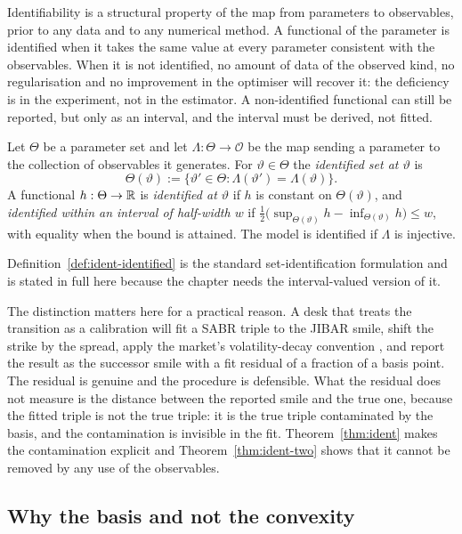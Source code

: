 \documentclass[../../../main.tex]{subfiles}
\begin{document}
Identifiability is a structural property of the map from parameters to observables, prior to any data and to any numerical method. A functional of the parameter is identified when it takes the same value at every parameter consistent with the observables. When it is not identified, no amount of data of the observed kind, no regularisation and no improvement in the optimiser will recover it: the deficiency is in the experiment, not in the estimator. A non-identified functional can still be reported, but only as an interval, and the interval must be derived, not fitted.

\begin{definition}\label{def:ident-identified}
Let $\Theta$ be a parameter set and let $\Lambda:\Theta\to\mathcal O$ be the map sending a parameter to the collection of observables it generates. For $\vartheta\in\Theta$ the \emph{identified set at $\vartheta$} is
\[
\Theta(\vartheta):=\{\vartheta'\in\Theta:\Lambda(\vartheta')=\Lambda(\vartheta)\}.
\]
A functional $h:\Theta\to\mathbb{R}$ is \emph{identified at $\vartheta$} if $h$ is constant on $\Theta(\vartheta)$, and \emph{identified within an interval of half-width $w$} if
$\tfrac12\big(\sup_{\Theta(\vartheta)}h-\inf_{\Theta(\vartheta)}h\big)\le w$, with equality when the bound is attained. The model is identified if $\Lambda$ is injective.
\end{definition}

Definition~\ref{def:ident-identified} is the standard set-identification formulation and is stated in full here because the chapter needs the interval-valued version of it.

The distinction matters here for a practical reason. A desk that treats the transition as a calibration will fit a SABR triple to the JIBAR smile, shift the strike by the spread, apply the market's volatility-decay convention \citep[\S8.3.2, eqs~(15)--(16), p.~29]{sarb2024conv}, and report the result as the successor smile with a fit residual of a fraction of a basis point. The residual is genuine and the procedure is defensible. What the residual does not measure is the distance between the reported smile and the true one, because the fitted triple is not the true triple: it is the true triple contaminated by the basis, and the contamination is invisible in the fit. Theorem~\ref{thm:ident} makes the contamination explicit and Theorem~\ref{thm:ident-two} shows that it cannot be removed by any use of the observables.

\subsection{Why the basis and not the convexity}
\end{document}
